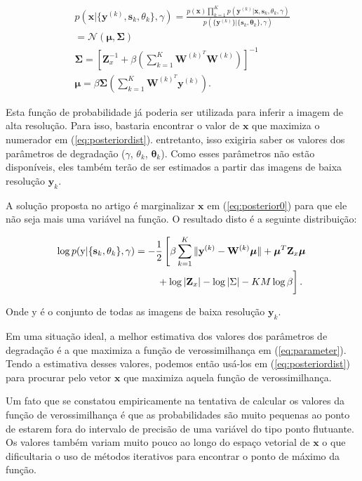 \documentclass[12pt,openright,oneside,a4paper,english,brazil]{abntex2}
\begin{document}
\begin{gather}
	\label{eq:posteriordist}
	p(\mathbf{x}|\{\mathbf{y}^{(k)},\mathbf{s}_k,\theta_k\}, \gamma) = 
	\frac{p(\mathbf{x})\prod^K_{k=1} p(\mathbf{y}^{(k)}|\mathbf{x},\mathbf{s}_k,\theta_k, \gamma)}
	{p(\{\mathbf{y}^{(k)}\}|\{\mathbf{s}_k,\mathbf{\theta}_k\},\gamma)} \\
	= \mathcal{N}(\boldsymbol{\mu},\mathbf{\Sigma}) \\
	\mathbf{ \Sigma }= \left[\mathbf{Z}^{-1}_x + \beta \left( \sum^K_{k = 1} \mathbf{W}^{(k)^T} \mathbf{W}^{(k)} \right) \right]^{-1} \\
	\boldsymbol{\mu} = \beta \mathbf{ \Sigma } \left( \sum^K_{k=1} \mathbf{W}^{(k)^T}\mathbf{y}^{(k)} \right).
\end{gather}

Esta função de probabilidade já poderia ser utilizada para inferir a imagem de alta resolução.
Para isso, bastaria encontrar o valor de $\mathbf{x}$ que maximiza o numerador em (\ref{eq:posteriordist}). entretanto, isso exigiria saber os valores dos parâmetros de degradação ($\gamma$, $\theta_k$, $\mathbf{\theta}_k$).
Como esses parâmetros não estão disponíveis, eles também terão de ser estimados a partir das imagens de baixa resolução $\mathbf{y}_k$. 

A solução proposta no artigo é marginalizar $\mathbf{x}$ em (\ref{eq:posterior0}) para que ele não seja mais uma variável na função. O resultado disto é a seguinte distribuição:

\begin{align}
	\label{eq:parameter}
	\log p(\mathrm{y}|\{\mathbf{s}_k,\theta_k\}, \gamma) &= -\frac{1}{2}\left[\beta \sum^K_{k=1} \|\mathbf{y}^{(k)} - \mathbf{W}^{(k)}\boldsymbol{\mu}\|
    + \boldsymbol{\mu}^T\mathbf{Z}_x \boldsymbol{\mu} \right. \nonumber \\
    &\qquad \left.\vphantom{\int_t} + \log |\mathbf{Z}_x| - \log{|\Sigma |} - KM \log \beta \right].
\end{align}

Onde y é o conjunto de todas as imagens de baixa resolução $\mathbf{y}_k$.

Em uma situação ideal, a melhor estimativa dos valores dos parâmetros de degradação é a que maximiza a função de verossimilhança em (\ref{eq:parameter}).
Tendo a estimativa desses valores, podemos então usá-los em (\ref{eq:posteriordist}) para procurar pelo vetor $\mathbf{x}$ que maximiza aquela função de verossimilhança.

Um fato que se constatou empiricamente na tentativa de calcular os valores da função de verossimilhança é que as probabilidades são muito pequenas ao ponto de estarem fora do intervalo de precisão de uma variável do tipo ponto flutuante.
Os valores também variam muito pouco ao longo do espaço vetorial de $\mathbf{x}$ o que dificultaria o uso de métodos iterativos para encontrar o ponto de máximo da função.
\end{document}
